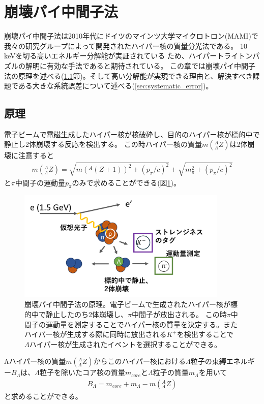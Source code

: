 \documentclass[a4paper,11pt,uplatex]{jsbook}
\begin{document}
\section{崩壊パイ中間子法}\label{DPS}
崩壊パイ中間子法は2010年代にドイツのマインツ大学マイクロトロン(MAMI)で我々の研究グループによって開発されたハイパー核の質量分光法である\cite{esserObservation4Hyperhydrogen2015}。
10 keVを切る高いエネルギー分解能が実証されている\cite{Schulz2015} ため、ハイパートライトンパズルの解明に有効な手法であると期待されている。
この章では崩壊パイ中間子法の原理を述べる(\ref{sec:dps principle}節)。そして高い分解能が実現できる理由と、解決すべき課題である大きな系統誤差について述べる(\ref{sec:systematic_error})。
\subsection{原理}\label{sec:dps principle}
電子ビームで電磁生成したハイパー核が核破砕し、目的のハイパー核が標的中で静止し2体崩壊する反応を検出する。
この時ハイパー核の質量$m(^A_{\Lambda}Z)$は2体崩壊に注意すると
\begin{eqnarray}
  m(^A_{\Lambda}Z) = \sqrt{m(^A(Z+1))^2 + (p_\pi/c)^2} + \sqrt{m_\pi^2 + (p_\pi/c)^2} \label{mass formula}
\end{eqnarray}
と$\pi$中間子の運動量$p_\pi$のみで求めることができる(図\ref{fig:DPS})。
\begin{figure}[H]
  \centering
  \includegraphics[width=10cm]{image/1-DPS.png}
  \caption[崩壊パイ中間子法の原理]{崩壊パイ中間子法の原理。電子ビームで生成されたハイパー核が標的中で静止したのち2体崩壊し、$\pi$中間子が放出される。
  この時$\pi$中間子の運動量を測定することでハイパー核の質量を決定する。またハイパー核が生成する際に同時に放出される$K^+$を検出することで
  $\Lambda$ハイパー核が生成されたイベントを選択することができる。}\label{fig:DPS}
\end{figure}

Λハイパー核の質量$m(^A_\Lambda Z)$からこのハイパー核における$\Lambda$粒子の束縛エネルギー$B_\Lambda$は、$\Lambda$粒子を除いたコア核の質量$m_{core}$と$\Lambda$粒子の質量$m_\Lambda$を用いて
\begin{eqnarray}
  B_\Lambda = m_{core} + m_\Lambda - m(^A_\Lambda Z) \label{binding energy formula}
\end{eqnarray}
と求めることができる。
\end{document}
